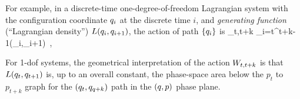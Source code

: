  For example, in a
discrete-time one-degree-of-freedom Lagrangian system with the configuration
coordinate $q_i$ at the discrete time $i$, and \emph{generating function}
(``Lagrangian density'') $L(q_{i},q_{i+1})$, the action of path
$\{q_i\}$ is
\beq
\action_{t,t+k} \equiv \sum_{i=t}^{t+k-1}\genF(\coord_{i},\coord_{i+1})
\,,

For 1-dof systems,
the geometrical interpretation of the action
$W_{t,t+k}$ is that $L(q_{t},q_{t+1})$ is, up to an overall
constant, the phase-space area below the $p_t$ to $p_{t+k}$
graph for the $(q_t,q_{q+k})$ path in the
$(q,p)$ phase plane.




